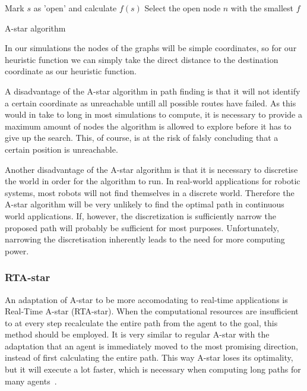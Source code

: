 \documentclass{report}
\begin{document}
			\begin{algorithm}[H]
				Mark $s$ as 'open' and calculate $f(s)$\;
				Select the open node $n$ with the smallest $f$\;
				\caption{A-star algorithm~\protect\cite{4082128}}
				\label{alg:astar}
			\end{algorithm}

			In our simulations the nodes of the graphs will be simple coordinates, so for our heuristic function we can simply take the direct distance to the destination coordinate as our heuristic function.

			A disadvantage of the A-star algorithm in path finding is that it will not identify a certain coordinate as unreachable untill all possible routes have failed. As this would in take to long in most simulations to compute, it is necessary to provide a maximum amount of nodes the algorithm is allowed to explore before it has to give up the search. This, of course, is at the risk of falsly concluding that a certain position is unreachable.

			Another disadvantage of the A-star algorithm is that it is necessary to discretise the world in order for the algorithm to run. In real-world applications for robotic systems, most robots will not find themselves in a discrete world. Therefore the A-star algorithm will be very unlikely to find the optimal path in continuous world applications. If, however, the discretization is sufficiently narrow the proposed path will probably be sufficient for most purposes. Unfortunately, narrowing the discretisation inherently leads to the need for more computing power.

			\subsubsection{RTA-star}
				An adaptation of A-star to be more accomodating to real-time applications is Real-Time A-star (RTA-star). When the computational resources are insufficient to at every step recalculate the entire path from the agent to the goal, this method should be employed. It is very similar to regular A-star with the adaptation that an agent is immediately moved to the most promising direction, instead of first calculating the entire path. This way A-star loses its optimality, but it will execute a lot faster, which is necessary when computing long paths for many agents~\cite{korf1990real}.
\end{document}
